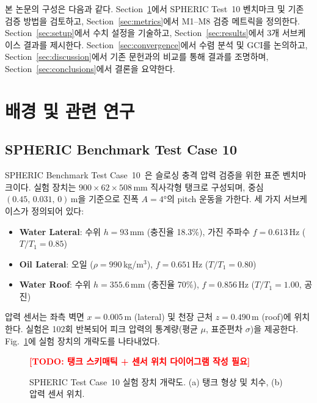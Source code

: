 \documentclass[11pt]{article}
\newcommand{\TODO}[1]{\textcolor{red}{\textbf{[TODO: #1]}}}
\newcommand{\fref}[1]{Fig.~\ref{#1}}
\newcommand{\sref}[1]{Section~\ref{#1}}
\begin{document}

본 논문의 구성은 다음과 같다.
\sref{sec:background}에서 SPHERIC Test~10 벤치마크 및 기존 검증 방법을 검토하고,
\sref{sec:metrics}에서 M1--M8 검증 메트릭을 정의한다.
\sref{sec:setup}에서 수치 설정을 기술하고,
\sref{sec:results}에서 3개 서브케이스 결과를 제시한다.
\sref{sec:convergence}에서 수렴 분석 및 GCI를 논의하고,
\sref{sec:discussion}에서 기존 문헌과의 비교를 통해 결과를 조명하며,
\sref{sec:conclusions}에서 결론을 요약한다.


\section{배경 및 관련 연구} \label{sec:background}
\setcounter{equation}{0}

\subsection{SPHERIC Benchmark Test Case 10} \label{sec:spheric}

SPHERIC Benchmark Test Case~10~\cite{BotiaVera2010, SoutoIglesias2011}은
슬로싱 충격 압력 검증을 위한 표준 벤치마크이다.
실험 장치는 $900 \times 62 \times 508$\,mm 직사각형 탱크로 구성되며,
중심 $(0.45,\, 0.031,\, 0)$\,m을 기준으로 진폭 $A = 4°$의 pitch 운동을 가한다.
세 가지 서브케이스가 정의되어 있다:
\begin{itemize}
    \item \textbf{Water Lateral}: 수위 $h = 93$\,mm (충진율 18.3\%), 가진 주파수 $f = 0.613$\,Hz ($T/T_1 = 0.85$)
    \item \textbf{Oil Lateral}: 오일 ($\rho = 990$\,kg/m$^3$), $f = 0.651$\,Hz ($T/T_1 = 0.80$)
    \item \textbf{Water Roof}: 수위 $h = 355.6$\,mm (충진율 70\%), $f = 0.856$\,Hz ($T/T_1 = 1.00$, 공진)
\end{itemize}

압력 센서는 좌측 벽면 $x = 0.005$\,m (lateral) 및 천장 근처 $z = 0.490$\,m (roof)에 위치한다.
실험은 102회 반복되어 피크 압력의 통계량(평균 $\mu$, 표준편차 $\sigma$)을 제공한다.
\fref{fig:tank-schematic}에 실험 장치의 개략도를 나타내었다.

\begin{figure}[H]
    \centering
    \TODO{탱크 스키매틱 + 센서 위치 다이어그램 작성 필요}
    \caption{SPHERIC Test Case~10 실험 장치 개략도.
    (a) 탱크 형상 및 치수, (b) 압력 센서 위치.}
    \label{fig:tank-schematic}
\end{figure}
\end{document}
